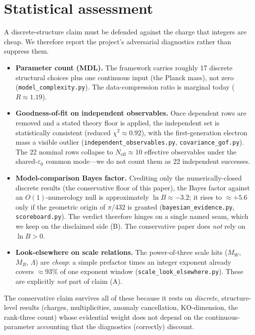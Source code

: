 \documentclass[11pt,a4paper]{article}
\theoremstyle{plain}
\newcommand{\code}[1]{\texttt{#1}}
\newcommand{\epso}{\varepsilon_0}
\begin{document}
\section{Statistical assessment}
\label{sec:stats}

A discrete-structure claim must be defended against the charge that integers are
cheap. We therefore report the project's adversarial diagnostics rather than
suppress them.

\begin{itemize}[leftmargin=1.4em]
\item \textbf{Parameter count (MDL).} The framework carries roughly 17 discrete
  structural choices plus one continuous input (the Planck mass), not zero
  (\code{model\_complexity.py}). The data-compression ratio is marginal today
  ($R \approx 1.19$).
\item \textbf{Goodness-of-fit on independent observables.} Once dependent rows are
  removed and a stated theory floor is applied, the independent set is
  statistically consistent (reduced $\chi^2 \approx 0.92$), with the
  first-generation electron mass a visible outlier
  (\code{independent\_observables.py}, \code{covariance\_gof.py}). The 22 nominal
  rows collapse to $N_{\mathrm{eff}} \approx 10$ effective observables under the
  shared-$\epso$ common mode---we do not count them as 22 independent successes.
\item \textbf{Model-comparison Bayes factor.} Crediting only the
  numerically-closed discrete results (the conservative floor of this paper), the
  Bayes factor against an $O(1)$-numerology null is approximately
  $\ln B \approx -3.2$; it rises to $\approx +5.6$ only if the geometric origin of
  $\pi/432$ is granted (\code{bayesian\_evidence.py}, \code{scoreboard.py}). The
  verdict
  therefore hinges on a single named seam, which we keep on the disclaimed side
  (B). The conservative paper does \emph{not} rely on $\ln B > 0$.
\item \textbf{Look-elsewhere on scale relations.} The power-of-three scale hits
  ($M_W$, $M_R$, $\Lambda$) are \emph{cheap}: a simple prefactor times an integer
  exponent already covers $\approx 93\%$ of one exponent window
  (\code{scale\_look\_elsewhere.py}). These are explicitly \emph{not} part of claim
  (A).
\end{itemize}

The conservative claim survives all of these because it rests on \emph{discrete},
structure-level results (charges, multiplicities, anomaly cancellation,
KO-dimension, the rank-three count) whose evidential weight does not depend on the
continuous-parameter accounting that the diagnostics (correctly) discount.
\end{document}
